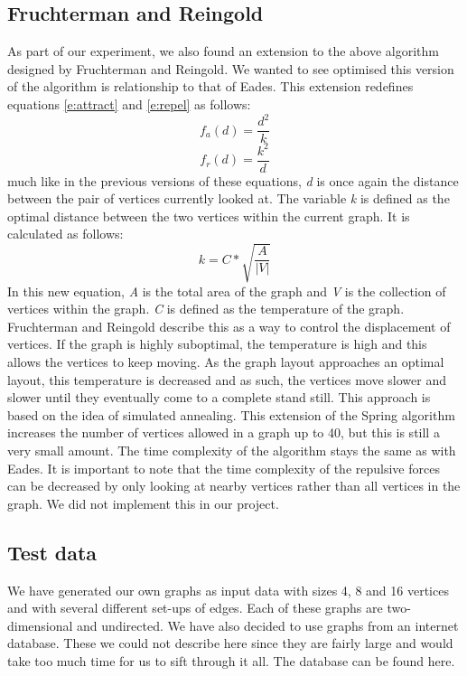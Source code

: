 \documentclass[a4paper,12pt]{article}
\begin{document}
\subsection{Fruchterman and Reingold}
As part of our experiment, we also found an extension to the above algorithm designed by Fruchterman and Reingold\cite{FandR}. We wanted to see optimised this version of the algorithm is relationship to that of Eades. This extension redefines equations \ref{e:attract} and \ref{e:repel} as follows:
\begin{equation}\label{e:FRattract}
f_a(d)=\frac{d^2}{k}
\end{equation}
\begin{equation}\label{e:FRrepel}
f_r(d)=\frac{k^2}{d}
\end{equation}
much like in the previous versions of these equations, \emph{d} is once again the distance between the pair of vertices currently looked at. The variable \emph{k} is defined as the optimal distance between the two vertices within the current graph. It is calculated as follows:
\begin{equation}\label{e:optimalD}
k=C*\sqrt{\frac{A}{|V|}}
\end{equation}
In this new equation, \emph{A} is the total area of the graph and \emph{V} is the collection of vertices within the graph. \emph{C} is defined as the temperature of the graph. Fruchterman and Reingold describe this as a way to control the displacement of vertices. If the graph is highly suboptimal, the temperature is high and this allows the vertices to keep moving. As the graph layout approaches an optimal layout, this temperature is decreased and as such, the vertices move slower and slower until they eventually come to a complete stand still. This approach is based on the idea of simulated annealing.
\newline
This extension of the Spring algorithm increases the number of vertices allowed in a graph up to 40, but this is still a very small amount. The time complexity of the algorithm stays the same as with Eades. It is important to note that the time complexity of the repulsive forces can be decreased by only looking at nearby vertices rather than all vertices in the graph. We did not implement this in our project.
\subsection{Test data}
We have generated our own graphs as input data with sizes 4, 8 and 16 vertices and with several different set-ups of edges. Each of these graphs are two-dimensional and undirected. We have also decided to use graphs from an internet database. These we could not describe here since they are fairly large and would take too much time for us to sift through it all. The database can be found here\cite{Database}.
\end{document}
